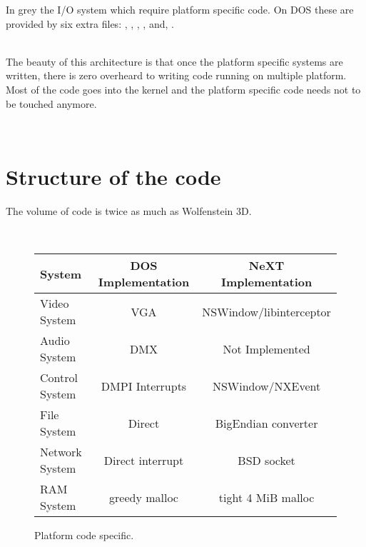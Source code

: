 \pagebreak


\par



In grey the I/O system which require platform specific code. On DOS these are provided by six extra files: , , , ,  and, .\\
\par
{}\\

The beauty of this architecture is that once the platform specific systems are written, there is zero overheard to writing code running on multiple platform. Most of the code goes into the kernel and the platform specific code needs not to be touched anymore.\\
\par
{}\\

\section{Structure of the code}
The volume of code is twice as much as Wolfenstein 3D.\\
\par
{}
\par





\\
\par
 \begin{figure}[H]
\centering  
\begin{tabularx}{\textwidth}{ L{0.22} | C{0.39} | C{0.39} }
  \toprule
  \textbf{System} & \textbf{DOS Implementation} & \textbf{NeXT Implementation}\\
  \toprule 
    Video System & VGA & NSWindow/libinterceptor\\
    Audio System & DMX & Not Implemented\\
    Control System & DMPI Interrupts & NSWindow/NXEvent \\
    File  System & Direct & BigEndian converter\\
    Network System & Direct interrupt & BSD socket \\
    RAM System & greedy malloc & tight 4 MiB malloc\\
   \toprule
\end{tabularx}
\caption{Platform code specific.}
\end{figure}

